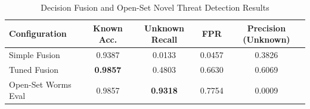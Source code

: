 \begin{table}[htbp]
\caption{Decision Fusion and Open-Set Novel Threat Detection Results}
\label{tab:fusion_results}
\centering
\begin{tabular}{lcccc}
\hline
\textbf{Configuration} & \textbf{Known Acc.} & \textbf{Unknown Recall} & \textbf{FPR} & \textbf{Precision (Unknown)} \\
\hline
Simple Fusion & 0.9387 & 0.0133 & 0.0457 & 0.3826 \\
Tuned Fusion & \textbf{0.9857} & 0.4803 & 0.6630 & 0.6069 \\
Open-Set Worms Eval & 0.9857 & \textbf{0.9318} & 0.7754 & 0.0009 \\
\hline
\end{tabular}
\end{table}
